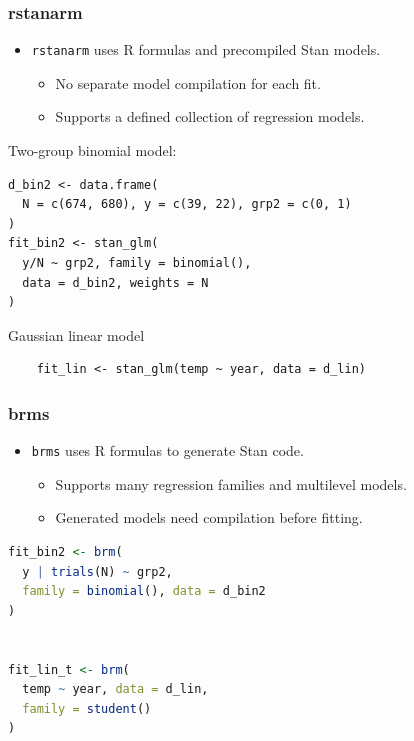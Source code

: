 \documentclass[10pt]{beamer}
\begin{document}
\begin{frame}[fragile]

\frametitle{rstanarm}

  \begin{itemize}
  \item \texttt{rstanarm} uses R formulas and precompiled Stan models.
    \begin{itemize}
    \item No separate model compilation for each fit.
    \item Supports a defined collection of regression models.
    \end{itemize}
  \end{itemize}

Two-group binomial model:
  {\scriptsize
\begin{lstlisting}
d_bin2 <- data.frame(
  N = c(674, 680), y = c(39, 22), grp2 = c(0, 1)
)
fit_bin2 <- stan_glm(
  y/N ~ grp2, family = binomial(),
  data = d_bin2, weights = N
)
\end{lstlisting}
  }
    Gaussian linear model
  {\scriptsize
\begin{lstlisting}
    fit_lin <- stan_glm(temp ~ year, data = d_lin)
\end{lstlisting}
  }


\end{frame}


\begin{frame}[fragile]

\frametitle{brms}

  \begin{itemize}
  \item \texttt{brms} uses R formulas to generate Stan code.
    \begin{itemize}
    \item Supports many regression families and multilevel models.
    \item Generated models need compilation before fitting.
    \end{itemize}
  \end{itemize}

  {\scriptsize
\begin{lstlisting}[language=R]
fit_bin2 <- brm(
  y | trials(N) ~ grp2,
  family = binomial(), data = d_bin2
)


fit_lin_t <- brm(
  temp ~ year, data = d_lin,
  family = student()
)
\end{lstlisting}
    }

\end{frame}
\end{document}
